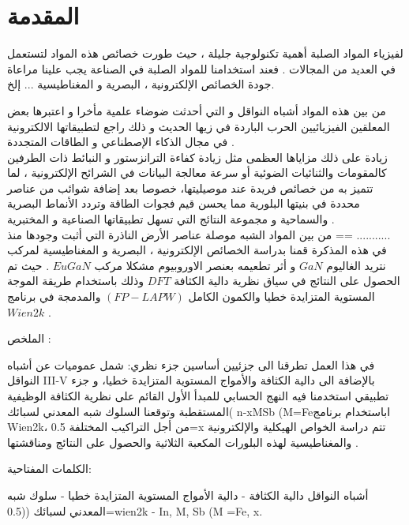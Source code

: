 \chapter*{المقدمة} %

\label{Chapter0} 

\newcommand{\keyword}[1]{\textbf{#1}}
\newcommand{\tabhead}[1]{\textbf{#1}}
\newcommand{\code}[1]{\texttt{#1}}


لفيزياء المواد الصلبة أهمية تكنولوجية جليلة ، حيث طورت خصائص هذه المواد لتستعمل في العديد من المجالات . فعند استخدامنا للمواد الصلبة في الصناعة يجب علينا مراعاة جودة الخصائص الإلكترونية ، البصرية و المغناطيسية ... إلخ.

من بين هذه المواد أشباه النواقل و التي أحدثت ضوضاء علمية مأخرا و اعتبرها بعض المعلقين الفيزيائيين الحرب الباردة في زيها الحديث و ذلك راجع لتطبيقاتها الالكترونية في مجال الذكاء الإصطناعي و الطاقات المتجددة .\\

زيادة على ذلك مزاياها العظمى مثل زيادة كفاءة الترانزستور و النبائط ذات الطرفين كالمقومات والثنائيات الضوئية أو سرعة معالجة البيانات في الشرائح الإلكترونية ، لما تتميز به من خصائص فريدة عند موصيليتها، خصوصا بعد إضافة شوائب من عناصر محددة في بنيتها البلورية مما يحسن قيم فجوات الطاقة وتردد الأنماط البصرية والسماحية و مجموعة النتائج التي تسهل تطبيقاتها الصناعية و المختبرية . \\

من بين المواد الشبه موصلة عناصر الأرض الناذرة التي أثبت وجودها منذ == ...........
\\
في هذه المذكرة قمنا بدراسة الخصائص الإلكترونية ، البصرية و المغناطيسية لمركب نتريد الغاليوم $ GaN $ و أثر تطعيمه بعنصر الاوروبيوم مشكلا مركب $ EuGaN $ . حيث تم الحصول على النتائج في سياق نظرية دالية الكثافة $ DFT $ وذلك باستخدام طريقة الموجة المستوية المتزايدة خطيا والكمون الكامل $ (FP-LAPW) $ والمدمجة في برنامج $ Wien2k $ .

الملخص :

في هذا العمل تطرقنا الى جزئيين أساسين جزء نظري: شمل عموميات عن أشباه النواقل III-V بالإضافة الى دالية الكثافة والأمواج المستوية المتزايدة خطيا، و جزء تطبيقي استخدمنا فيه النهج الحسابي للمبدأ الأول القائم على نظرية الكثافة الوظيفية المستقطبة وتوقعنا السلوك شبه المعدني لسبائك( n-xMSb (M=Feاباستخدام برنامج Wien2k، من أجل التراكيب المختلفة 0.5=x تتم دراسة الخواص الهيكلية والإلكترونية والمغناطيسية لهذه البلورات المكعبة الثلاثية والحصول على النتائج ومناقشتها .

الكلمات المفتاحية:

أشباه النواقل دالية الكثافة - دالية الأمواج المستوية المتزايدة خطيا - سلوك شبه المعدني لسبائك ((0.5=wien2k - In, M, Sb (M =Fe, x.
